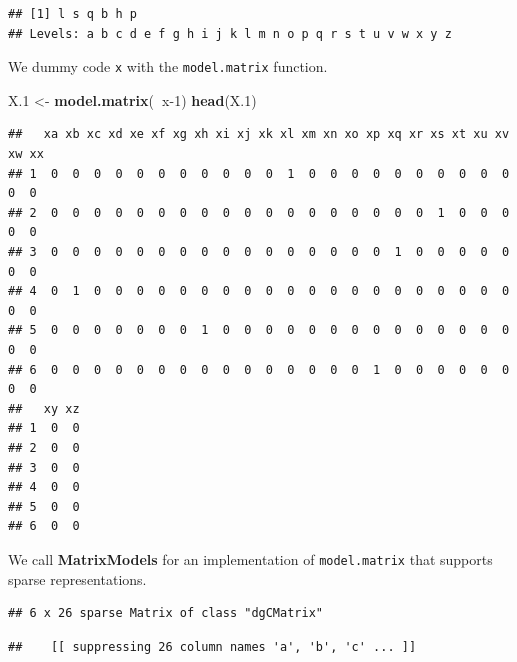 \documentclass[]{book}
\newenvironment{Shaded}{\begin{snugshade}}{\end{snugshade}}
\newcommand{\CommentTok}[1]{\textcolor[rgb]{0.56,0.35,0.01}{\textit{#1}}}
\newcommand{\DecValTok}[1]{\textcolor[rgb]{0.00,0.00,0.81}{#1}}
\newcommand{\FloatTok}[1]{\textcolor[rgb]{0.00,0.00,0.81}{#1}}
\newcommand{\KeywordTok}[1]{\textcolor[rgb]{0.13,0.29,0.53}{\textbf{#1}}}
\newcommand{\NormalTok}[1]{#1}
\newcommand{\OperatorTok}[1]{\textcolor[rgb]{0.81,0.36,0.00}{\textbf{#1}}}
\newcommand{\StringTok}[1]{\textcolor[rgb]{0.31,0.60,0.02}{#1}}
\theoremstyle{definition}
\theoremstyle{definition}
\theoremstyle{definition}
\theoremstyle{remark}
\begin{document}
\begin{verbatim}
## [1] l s q b h p
## Levels: a b c d e f g h i j k l m n o p q r s t u v w x y z
\end{verbatim}

We dummy code \texttt{x} with the \texttt{model.matrix} function.

\begin{Shaded}
\begin{Highlighting}[]
\NormalTok{X}\FloatTok{.1}\NormalTok{ <-}\StringTok{ }\KeywordTok{model.matrix}\NormalTok{(}\OperatorTok{~}\NormalTok{x}\DecValTok{-1}\NormalTok{)}
\KeywordTok{head}\NormalTok{(X}\FloatTok{.1}\NormalTok{)}
\end{Highlighting}
\end{Shaded}

\begin{verbatim}
##   xa xb xc xd xe xf xg xh xi xj xk xl xm xn xo xp xq xr xs xt xu xv xw xx
## 1  0  0  0  0  0  0  0  0  0  0  0  1  0  0  0  0  0  0  0  0  0  0  0  0
## 2  0  0  0  0  0  0  0  0  0  0  0  0  0  0  0  0  0  0  1  0  0  0  0  0
## 3  0  0  0  0  0  0  0  0  0  0  0  0  0  0  0  0  1  0  0  0  0  0  0  0
## 4  0  1  0  0  0  0  0  0  0  0  0  0  0  0  0  0  0  0  0  0  0  0  0  0
## 5  0  0  0  0  0  0  0  1  0  0  0  0  0  0  0  0  0  0  0  0  0  0  0  0
## 6  0  0  0  0  0  0  0  0  0  0  0  0  0  0  0  1  0  0  0  0  0  0  0  0
##   xy xz
## 1  0  0
## 2  0  0
## 3  0  0
## 4  0  0
## 5  0  0
## 6  0  0
\end{verbatim}

We call \textbf{MatrixModels} for an implementation of \texttt{model.matrix} that supports sparse representations.

\begin{Shaded}
\end{Shaded}

\begin{verbatim}
## 6 x 26 sparse Matrix of class "dgCMatrix"
\end{verbatim}

\begin{verbatim}
##    [[ suppressing 26 column names 'a', 'b', 'c' ... ]]
\end{verbatim}
\end{document}
